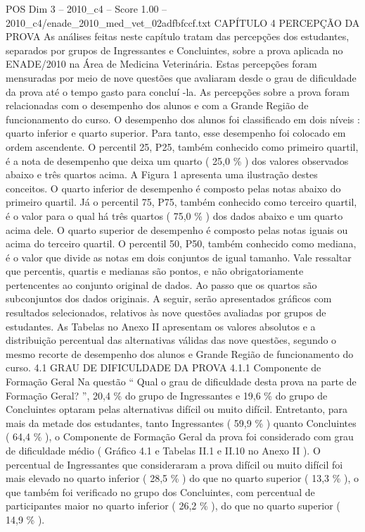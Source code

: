 \begin{textsample}{POS Dim 3 – 2010\_c4 – Score 1.00 – 2010\_c4/enade\_2010\_med\_vet\_02adfbfccf.txt}  \label{ex:f3_pos_147}
CAPÍTULO 4 PERCEPÇÃO DA PROVA As análises feitas neste capítulo tratam das percepções dos estudantes, separados por grupos de Ingressantes e Concluintes, sobre a prova aplicada no ENADE/2010 na Área de Medicina Veterinária.
Estas percepções foram mensuradas por meio de nove questões que avaliaram desde o grau de dificuldade da prova até o tempo gasto para concluí -la.
As percepções sobre a prova foram relacionadas com o desempenho dos alunos e com a Grande Região de funcionamento do curso.
O desempenho dos alunos foi classificado em dois níveis : quarto inferior e quarto superior.
Para tanto, esse desempenho foi colocado em ordem ascendente.
O percentil 25, P25, também conhecido como primeiro quartil, é a nota de desempenho que deixa um quarto ( 25,0 \% ) dos valores observados abaixo e três quartos acima.
A Figura 1 apresenta uma ilustração destes conceitos.
O quarto inferior de desempenho é composto pelas notas abaixo do primeiro quartil.
Já o percentil 75, P75, também conhecido como terceiro quartil, é o valor para o qual há três quartos ( 75,0 \% ) dos dados abaixo e um quarto acima dele.
O quarto superior de desempenho é composto pelas notas iguais ou acima do terceiro quartil.
O percentil 50, P50, também conhecido como mediana, é o valor que divide as notas em dois conjuntos de igual tamanho.
Vale ressaltar que percentis, quartis e medianas são pontos, e não obrigatoriamente pertencentes ao conjunto original de dados.
Ao passo que os quartos são subconjuntos dos dados originais.
A seguir, serão apresentados gráficos com resultados selecionados, relativos às nove questões avaliadas por grupos de estudantes.
As Tabelas no Anexo II apresentam os valores absolutos e a distribuição percentual das alternativas válidas das nove questões, segundo o mesmo recorte de desempenho dos alunos e Grande Região de funcionamento do curso. 4.1 GRAU DE DIFICULDADE DA PROVA 4.1.1 Componente de Formação Geral Na questão “ Qual o grau de dificuldade desta prova na parte de Formação Geral? ”, 20,4 \% do grupo de Ingressantes e 19,6 \% do grupo de Concluintes optaram pelas alternativas difícil ou muito difícil.
Entretanto, para mais da metade dos estudantes, tanto Ingressantes ( 59,9 \% ) quanto Concluintes ( 64,4 \% ), o Componente de Formação Geral da prova foi considerado com grau de dificuldade médio ( Gráfico 4.1 e Tabelas II.1 e II.10 no Anexo II ).
O percentual de Ingressantes que consideraram a prova difícil ou muito difícil foi mais elevado no quarto inferior ( 28,5 \% ) do que no quarto superior ( 13,3 \% ), o que também foi verificado no grupo dos Concluintes, com percentual de participantes maior no quarto inferior ( 26,2 \% ), do que no quarto superior ( 14,9 \% ).

\end{textsample}
